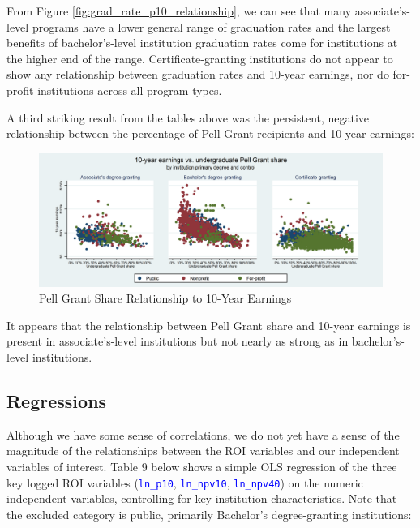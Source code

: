 \documentclass[12pt]{article}
\numberwithin{equation}{section}
\newcommand{\Varnm}[1]{\texttt{\textcolor{Blue}{#1}}}
\begin{document}
From Figure \ref{fig:grad_rate_p10_relationship}, we can see that many associate’s-level programs have a lower general range of graduation rates and the largest benefits of bachelor’s-level institution graduation rates come for institutions at the higher end of the range. Certificate-granting institutions do not appear to show any relationship between graduation rates and 10-year earnings, nor do for-profit institutions across all program types.

A third striking result from the tables above was the persistent, negative relationship between the percentage of Pell Grant recipients and 10-year earnings:

\begin{figure}[h!]
\caption{Pell Grant Share Relationship to 10-Year Earnings}
\label{fig:pct_pell_p10_relationship}
\begin{adjustbox}{center}
\includegraphics[width=7.0in]{../p10_pctpell_correlations_by_preddeg_mr.png}
\end{adjustbox}
\centering
\end{figure}

It appears that the relationship between Pell Grant share and 10-year earnings is present in associate's-level institutions but not nearly as strong as in bachelor's-level institutions.

\newpage
\subsection{Regressions}
Although we have some sense of correlations, we do not yet have a sense of the magnitude of the relationships between the ROI variables and our independent variables of interest. Table 9 below shows a simple OLS regression of the three key logged ROI variables (\Varnm{ln\_p10}, \Varnm{ln\_npv10}, \Varnm{ln\_npv40}) on the numeric independent variables, controlling for key institution characteristics. Note that the excluded category is public, primarily Bachelor's degree-granting institutions:
\end{document}
